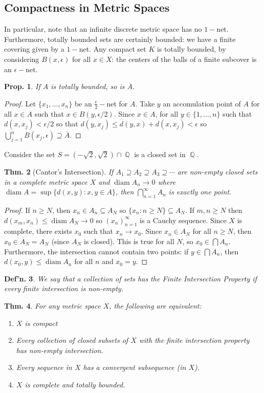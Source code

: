 \documentclass[12pt, a4paper]{book}
\DeclareMathOperator{\Q}{\mathbb{Q}}
\DeclareMathOperator{\diam}{diam}
\newtheorem{theorem}{Thm.}[section]
\newtheorem{definition}[theorem]{Def'n.}
\newtheorem{proposition}[theorem]{Prop.}
\theoremstyle{nonumberplain}
\newtheorem{proof}{Proof}
\begin{document}
\subsection{Compactness in Metric Spaces}
In particular, note that an infinite discrete metric space has no $1-$net. Furthermore, totally bounded sets are certainly
bounded: we have a finite covering given by a $1-$net. Any compact set $K$ is totally bounded, by considering $B(x,\epsilon)$
for all $x\in X$: the centers of the balls of a finite subcover is an $\epsilon-$net.
\begin{proposition}
    If $A$ is totally bounded, so is $\overline{A}$.
\end{proposition}
\begin{proof}
    Let $\{x_1,\ldots,x_n\}$ be an $\frac{\epsilon}{2}-$net for $A$. Take $y$ an accomulation point of $A$ for all $x\in A$
    such that $x\in B(y,\epsilon/2)$. Since $x\in A$, for all $y\in\{1,\ldots,n\}$ such that $d(x,x_j)<\epsilon/2$
    so that $d(y,x_j)\leq d(y,x)+d(x,x_j)<\epsilon$ so $\bigcup_{j=1}^n B(x_j,\epsilon)\supseteq\overline{A}$.
\end{proof}
Consider the set $S=(-\sqrt{2},\sqrt{2})\cap\Q$ is a closed set in $\Q$.
\begin{theorem}[Cantor's Intersection]
    If $A_1\supseteq A_2\supseteq A_3\supseteq\cdots$ are non-empty closed sets in a complete metric space $X$ and $\diam A_n\to 0$
    where $\diam A=\sup\{d(x,y):x,y\in A\}$, then $\bigcap_{n=1}^\infty A_n$ is exactly one point.
\end{theorem}
\begin{proof}
    If $n\geq N$, then $x_n\in A_n\subseteq A_N$ so $\{x_n:n\geq N\}\subseteq A_N$. If $m,n\geq N$ then $d(x_m,x_n)\leq\diam A_N\to 0$
    so $(x_n)_{n=1}^\infty$ is a Cauchy sequence. Since $X$ is complete, there exists $x_0$ such that $x_n\to x_0$. Since
    $x_n\in A_N$ for all $n\geq N$, then $x_0\in\overline{A}_N=A_N$ (since $A_N$ is closed). This is true for all $N$, so
    $x_0\in \bigcap A_n$. Furthermore, the intersection cannot contain two points: if $y\in\bigcap A_n$, then $d(x_0,y)\leq\diam A_n$
    for all $n$ and $x_0=y$.
\end{proof}
\begin{definition}
    We say that a collection of sets has the Finite Intersection Property if every finite intersection is non-empty.
\end{definition}
\begin{theorem}
    For any metric space $X$, the following are equivalent:
    \begin{enumerate}
        \item $X$ is compact
        \item Every collection of closed subsets of $X$ with the finite intersection property has non-empty intersection.
        \item Every sequence in $X$ has a convergent subsequence (in $X$).
        \item $X$ is complete and totally bounded.
    \end{enumerate}
\end{theorem}
\end{document}
